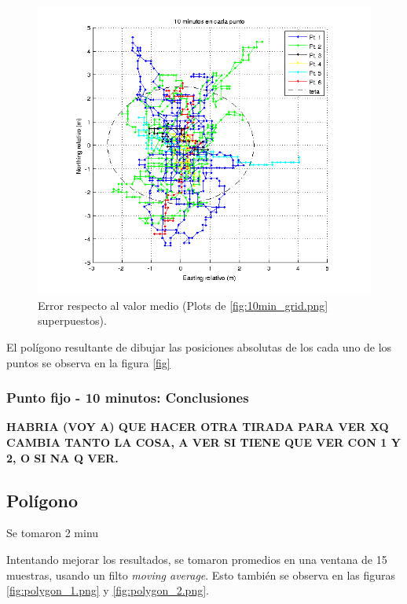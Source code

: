 \documentclass[spanish,12pt,a4paper,titlepage]{report}
\begin{document}
\begin{figure}[h!]
  \includegraphics[width=1.1\textwidth]{./img/10min_todos.png}
  \caption{Error respecto al valor medio (Plots de \ref{fig:10min_grid.png} superpuestos).}
  \label{fig:10min_todos.png}
\end{figure}

El polígono resultante de dibujar las posiciones absolutas de los cada uno de los puntos se observa en la figura \ref{fig}

\subsubsection{Punto fijo - 10 minutos: Conclusiones}
\label{sec:gps2-punto-fijo-conclusiones}


\textbf{HABRIA (VOY A) QUE HACER OTRA TIRADA PARA VER XQ CAMBIA TANTO LA COSA, A VER SI TIENE QUE VER CON 1 Y 2, O SI NA Q VER.}

\newpage
\subsection{Polígono}
\label{sec:gps2-poligono}

Se tomaron 2 minu

Intentando mejorar los resultados, se tomaron promedios en una ventana de 15 muestras, usando un filto \textit{moving average}. Esto también se observa en las figuras \ref{fig:polygon_1.png} y \ref{fig:polygon_2.png}.
\end{document}
